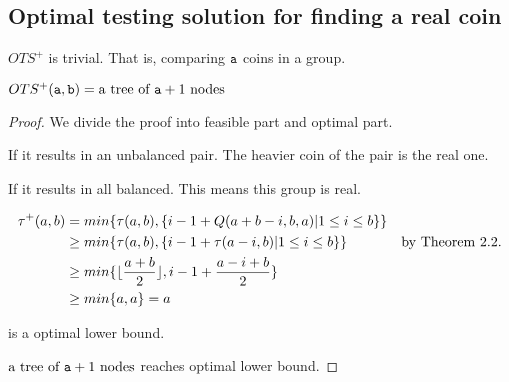 \subsection*{Optimal testing solution for finding a real coin}

$OTS^+$ is trivial.
That is, comparing $\mathtt{a}$ coins in a group. 

\begin{theorem}
$OTS^+(\mathtt{a},\mathtt{b})=\text{a tree of }\mathtt{a}+1\text{ nodes}$
\end{theorem}
\begin{proof}
We divide the proof into feasible part and optimal part.


If it results in an unbalanced pair. The heavier coin of the pair is the real one.

If it results in all balanced. This means this group is real.

\begin{align*}
\tau^+(a,b)&=min\{\tau(a,b), \{i-1+Q(a+b-i,b,a) | 1\leq i\leq b\} \}&\\
&\geq min\{\tau(a,b), \{i-1+\tau(a-i,b) | 1\leq i\leq b\} \} &\text{by Theorem 2.2.}\\
&\geq min\{\lfloor\frac{a+b}{2}\rfloor, i-1+\frac{a-i+b}{2}\}&\\
&\geq min\{a, a\}=a &
\end{align*}

is a optimal lower bound.

$\text{a tree of }\mathtt{a}+1\text{ nodes}$ reaches optimal lower bound.
\end{proof}